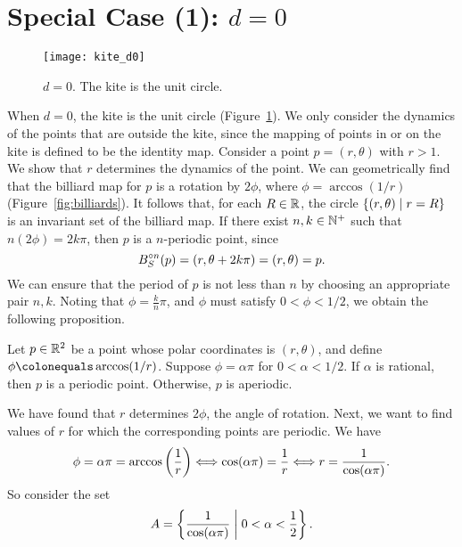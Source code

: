 \documentclass[12pt,twoside]{book}
\begin{document}
\section{Special Case (1): $d = 0$}
\begin{figure}[ht]
  \begin{center}
    \texttt{[image: kite\_d0]}
    \caption{$d = 0$. The kite is the unit circle.}
    \label{fig:kite-circle}
  \end{center}
\end{figure}
When $d = 0$, the kite is the unit circle (Figure~\ref{fig:kite-circle}).
We only consider the dynamics of the points that are outside the kite, since the mapping of points in or on the kite is defined to be the identity map.
Consider a point $p = (r, \theta)$ with $r > 1$.
We show that $r$ determines the dynamics of the point.
We can geometrically find that the billiard map for $p$ is a rotation by $2\phi$, where $\phi = \arccos(1/r)$ (Figure~\ref{fig:billiards}).
It follows that, for each $R \in \mathbb{R}$, the circle $\left \{ (r,\theta) \mathrel{} \middle| \mathrel{} r = R \right \}$ is an invariant set of the billiard map.
If there exist $n, k \in \mathbb{N}^+$ such that $n(2\phi) = 2k\pi$, then $p$ is a $n$-periodic point, since 
\begin{equation*}
  B_S^{\circ n}(p) = (r, \theta + 2k\pi) = (r, \theta) = p.
\end{equation*}
We can ensure that the period of $p$ is not less than $n$ by choosing an appropriate pair $n,k$.
Noting that $\phi = \frac{k}{n}\pi$, and $\phi$ must satisfy $0 < \phi < 1/2$, we obtain the following proposition.
\begin{proposition}
  Let $p \in \mathbb{R}^2$ be a point whose polar coordinates is $(r,\theta)$, and define $\phi \ceq \arccos(1/r)$.
  Suppose $\phi = \alpha\pi$ for $0 < \alpha < 1/2$.
  If $\alpha$ is rational, then $p$ is a periodic point.
  Otherwise, $p$ is aperiodic.
\end{proposition}
We have found that $r$ determines $2\phi$, the angle of rotation.
Next, we want to find values of $r$ for which the corresponding points are periodic.
We have
\begin{equation*}
  \phi = \alpha\pi = \arccos\left (  \frac{1}{r}  \right ) 
  \Longleftrightarrow \cos(\alpha\pi) = \frac{1}{r}
  \Longleftrightarrow r = \frac{1}{\cos(\alpha\pi)}.
\end{equation*}
So consider the set
\begin{equation*}
  A = \left \{ \frac{1}{\cos(\alpha\pi)} \mathrel{} \middle| \mathrel{} 0 < \alpha < \frac{1}{2} \right \}.
\end{equation*}
\end{document}
